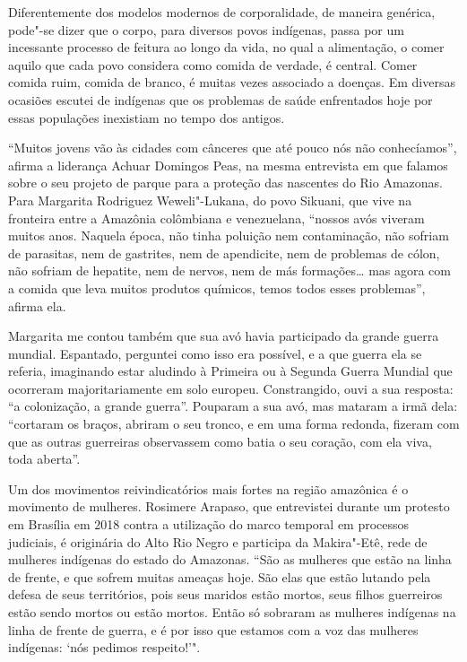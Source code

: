 Diferentemente dos modelos modernos de corporalidade, de maneira
genérica, pode"-se dizer que o corpo, para diversos povos indígenas, passa por um
incessante processo de feitura ao longo da vida, no qual a alimentação,
o comer aquilo que cada povo considera como comida de verdade, é
central. Comer comida ruim, comida de branco, é muitas vezes associado a
doenças. Em diversas ocasiões escutei de indígenas que os problemas de
saúde enfrentados hoje por essas populações inexistiam no tempo dos
antigos.

``Muitos jovens vão às cidades com cânceres que até pouco nós não
conhecíamos'', afirma a liderança Achuar Domingos Peas, na mesma
entrevista em que falamos sobre o seu projeto de parque para a proteção
das nascentes do Rio Amazonas. Para Margarita Rodriguez Weweli"-Lukana, do
povo Sikuani, que vive na fronteira entre a Amazônia colômbiana e
venezuelana, ``nossos avós viveram muitos anos. Naquela época, não tinha
poluição nem contaminação, não sofriam de parasitas, nem de gastrites,
nem de apendicite, nem de problemas de cólon, não sofriam de hepatite,
nem de nervos, nem de más formações\ldots{} mas agora com a comida que
leva muitos produtos químicos, temos todos esses problemas'', afirma
ela.

Margarita me contou também que sua avó havia participado da grande
guerra mundial. Espantado, perguntei como isso era possível, e a que
guerra ela se referia, imaginando estar aludindo à Primeira ou à Segunda
Guerra Mundial que ocorreram majoritariamente em solo europeu.
Constrangido, ouvi a sua resposta: ``a colonização, a grande guerra''.
Pouparam a sua avó, mas mataram a irmã dela: ``cortaram os braços,
abriram o seu tronco, e em uma forma redonda, fizeram com que as outras
guerreiras observassem como batia o seu coração, com ela viva, toda
aberta''.

Um dos movimentos reivindicatórios mais fortes na região amazônica é o
movimento de mulheres. Rosimere Arapaso, que entrevistei durante um
protesto em Brasília em 2018 contra a utilização do marco temporal em
processos judiciais, é originária do Alto Rio Negro e participa da
Makira"-Etê, rede de mulheres indígenas do estado do Amazonas. ``São as
mulheres que estão na linha de frente, e que sofrem muitas ameaças hoje.
São elas que estão lutando pela defesa de seus territórios, pois seus
maridos estão mortos, seus filhos guerreiros estão sendo mortos ou estão
mortos. Então só sobraram as mulheres indígenas na linha de frente de
guerra, e é por isso que estamos com a voz das mulheres indígenas: `nós
pedimos respeito!'".

